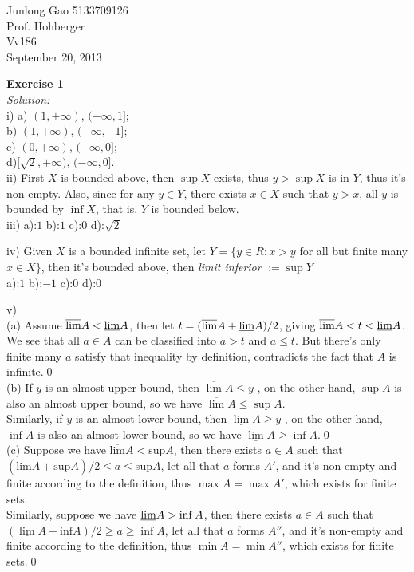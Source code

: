 \documentclass[12pt]{article}
\begin{document}
\begin{flushleft}
Junlong Gao 5133709126\\
Prof. Hohberger\\
Vv186\\
September 20, 2013\\%
\end{flushleft}


\textbf{Exercise 1}\\
\textit{Solution:}\\
i) a) $(1,+\infty)$, $(-\infty,1]$; \\
b) $(1,+\infty)$, $(-\infty, -1]$;\\
c) $(0,+\infty)$, $(-\infty,0]$; \\
d)$[\sqrt{2},+\infty)$, $(-\infty, 0]$.\\

ii) First $X$ is bounded above,
then $\sup X$ exists,
thus  $y>\sup X$ is in $Y$,
thus it's non-empty.
Also, since for any $y\in Y$,
there exists $x\in X$ such that $y>x$,
all $y$ is bounded by $\inf X$,
that is, $Y$ is bounded below.\\

iii) a):$1$ b):$1$ c):$0$ d):$\sqrt{2}$

iv) Given $X$ is a bounded infinite set, let $Y=\{y\in R: x>y $ for all but finite many $ x\in X\}$,
then it's bounded above, then \textit{limit inferior} $:=\sup Y$\\
a):$1$ b):$-1$ c):$0$ d):$0$

v)\\
(a) Assume $\overline{\text{lim}}A < \uline{\text{lim}}A$,
then let $t=(\overline{\text{lim}}A +\uline{\text{lim}}A)/2$, giving $\overline{\text{lim}}A<t<\uline{\text{lim}}A$. We see that all $a\in A$ can be classified into $a>t$ and $a\le t$.
But there's only finite many $a$ satisfy that inequality by definition,
contradicts the fact that $A$ is infinite.\qed\\

(b) If $y$ is an almost upper bound, then $\overline{\lim}A\leq y$ ,
on the other hand, $\sup A$ is also an almost upper bound, so we have $\overline{\lim}A\leq\sup A$.\\
Similarly, if $y$ is an almost lower bound, then $\underline{\lim}A\ge y$ ,
on the other hand, $\inf A$ is also an almost lower bound, so we have $\underline{\lim}A\ge\inf A$.\qed\\

(c) Suppose we have $\overline{\text{lim}}A<$sup$A$,
then there exists $a\in A$ such that $(\overline{\text{lim}}A+\text{sup}A)/2\leq a\leq $sup$A$, 
let all that $a$ forms $A'$, 
and it's non-empty and finite according to the definition,
thus ${\max A=\max A'}$, which exists for finite sets.\\
Similarly, suppose we have $\uline{\lim}A>\inf A$,
then there exists $a\in A$ such that $(\underline{\lim}A+\text{inf}A)/2\ge a\ge \inf A$,
let all that $a$ forms $A''$, and it's non-empty and finite according to the definition, 
thus ${\min A=\min A''}$, which exists for finite sets.\qed\\
\end{document}

